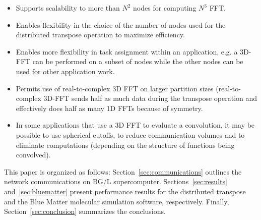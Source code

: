 \begin{itemize}
\item Supports scalability to more than $N^2$ nodes for computing $N^3$ FFT.
\item Enables flexibility in the choice of the number of nodes used
    for the distributed transpose operation to maximize efficiency.
  \item Enables more flexibility in task assignment within an
    application, e.g. a 3D-FFT can be performed on a subset of nodes
    while the other nodes can be used for other application work.
\item Permits use of real-to-complex 3D FFT on larger partition sizes
  (real-to-complex 3D-FFT sends half as much data during the transpose
  operation and effectively does half as many 1D FFTs because of symmetry.
\item In some applications that use a 3D FFT to evaluate a
  convolution, it may be possible to use spherical cutoffs, to reduce
  communication volumes and to eliminate computations (depending on
  the structure of functions being convolved).
\end{itemize}

This paper is organized as follows: 
Section~\ref{sec:communications} outlines the network communications on BG/L supercomputer.
Sections~\ref{sec:results} and~\ref{sec:bluematter} present performance results for the distributed transpose 
and the Blue Matter molecular simulation software, respectively. 
Finally, Section~\ref{sec:conclusion} summarizes the conclusions.
